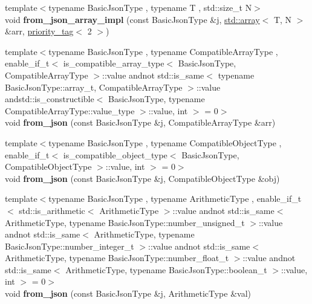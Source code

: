 \begin{DoxyCompactItemize}
\item 
{\footnotesize template$<$typename Basic\+Json\+Type , typename T , std\+::size\+\_\+t N$>$ }\\void {\bfseries from\+\_\+json\+\_\+array\+\_\+impl} (const Basic\+Json\+Type \&j, \hyperlink{namespacenlohmann_1_1detail_a1ed8fc6239da25abcaf681d30ace4985af1f713c9e000f5d3f280adbd124df4f5}{std\+::array}$<$ T, N $>$ \&arr, \hyperlink{structnlohmann_1_1detail_1_1priority__tag}{priority\+\_\+tag}$<$ 2 $>$)\hypertarget{namespacenlohmann_1_1detail_a46b0781205d0bdc5a959343b389966a4}{}\label{namespacenlohmann_1_1detail_a46b0781205d0bdc5a959343b389966a4}

\item 
{\footnotesize template$<$typename Basic\+Json\+Type , typename Compatible\+Array\+Type , enable\+\_\+if\+\_\+t$<$ is\+\_\+compatible\+\_\+array\+\_\+type$<$ Basic\+Json\+Type, Compatible\+Array\+Type $>$\+::value andnot std\+::is\+\_\+same$<$ typename Basic\+Json\+Type\+::array\+\_\+t, Compatible\+Array\+Type $>$\+::value andstd\+::is\+\_\+constructible$<$ Basic\+Json\+Type, typename Compatible\+Array\+Type\+::value\+\_\+type $>$\+::value, int $>$  = 0$>$ }\\void {\bfseries from\+\_\+json} (const Basic\+Json\+Type \&j, Compatible\+Array\+Type \&arr)\hypertarget{namespacenlohmann_1_1detail_a8dcac00852dbe1f61d1e78135b19d428}{}\label{namespacenlohmann_1_1detail_a8dcac00852dbe1f61d1e78135b19d428}

\item 
{\footnotesize template$<$typename Basic\+Json\+Type , typename Compatible\+Object\+Type , enable\+\_\+if\+\_\+t$<$ is\+\_\+compatible\+\_\+object\+\_\+type$<$ Basic\+Json\+Type, Compatible\+Object\+Type $>$\+::value, int $>$  = 0$>$ }\\void {\bfseries from\+\_\+json} (const Basic\+Json\+Type \&j, Compatible\+Object\+Type \&obj)\hypertarget{namespacenlohmann_1_1detail_a5e7a3674e8ac46f8feebad9712d7c55f}{}\label{namespacenlohmann_1_1detail_a5e7a3674e8ac46f8feebad9712d7c55f}

\item 
{\footnotesize template$<$typename Basic\+Json\+Type , typename Arithmetic\+Type , enable\+\_\+if\+\_\+t$<$ std\+::is\+\_\+arithmetic$<$ Arithmetic\+Type $>$\+::value andnot std\+::is\+\_\+same$<$ Arithmetic\+Type, typename Basic\+Json\+Type\+::number\+\_\+unsigned\+\_\+t $>$\+::value andnot std\+::is\+\_\+same$<$ Arithmetic\+Type, typename Basic\+Json\+Type\+::number\+\_\+integer\+\_\+t $>$\+::value andnot std\+::is\+\_\+same$<$ Arithmetic\+Type, typename Basic\+Json\+Type\+::number\+\_\+float\+\_\+t $>$\+::value andnot std\+::is\+\_\+same$<$ Arithmetic\+Type, typename Basic\+Json\+Type\+::boolean\+\_\+t $>$\+::value, int $>$  = 0$>$ }\\void {\bfseries from\+\_\+json} (const Basic\+Json\+Type \&j, Arithmetic\+Type \&val)\hypertarget{namespacenlohmann_1_1detail_a839b0ab50d2c9bce669068f56bc41202}{}\label{namespacenlohmann_1_1detail_a839b0ab50d2c9bce669068f56bc41202}


\end{DoxyCompactItemize}
